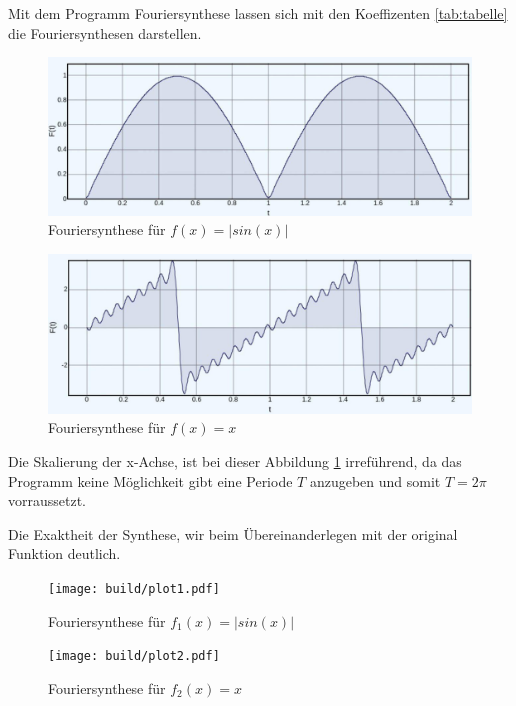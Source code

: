 Mit dem Programm Fouriersynthese \cite{Fouriersynthese} lassen sich mit den Koeffizenten \ref{tab:tabelle} die Fouriersynthesen darstellen.

\begin{figure}
    \centering
    \includegraphics[width=\textwidth]{website/sin.jpg}
    \caption{Fouriersynthese für $f(x)=|sin(x)|$}
\end{figure}


\begin{figure}
    \centering
    \includegraphics[width=\textwidth]{website/x.jpg}
    \caption{Fouriersynthese für $f(x)=x$}
    \label{fig:x_website}
\end{figure}
Die Skalierung der x-Achse, ist bei dieser Abbildung \ref{fig:x_website} irreführend, da das Programm \cite{Fouriersynthese} keine Möglichkeit gibt eine Periode $T$ anzugeben 
und somit $T=2\pi$ vorraussetzt.

\newpage

Die Exaktheit der Synthese, wir beim Übereinanderlegen mit der original Funktion deutlich.
\begin{figure}
    \centering
    \texttt{[image: build/plot1.pdf]}
    \caption{Fouriersynthese für $f_1(x)=|sin(x)|$}
    \label{fig:FS_sin}
\end{figure}

\begin{figure}
    \centering
    \texttt{[image: build/plot2.pdf]}
    \caption{Fouriersynthese für $f_2(x)=x$}
    \label{fig:FS_x}
\end{figure}
